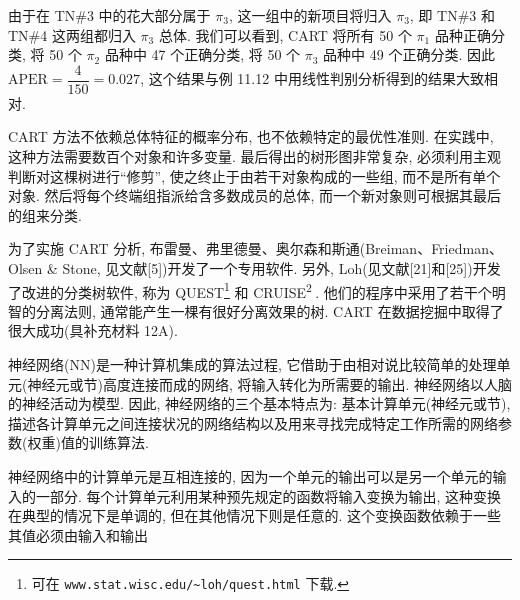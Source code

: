 由于在 TN\#3 中的花大部分属于 $\pi_3$, 这一组中的新项目将归入 $\pi_3$, 即 TN\#3 和 TN\#4 这两组都归入 $\pi_3$ 总体. 我们可以看到, CART 将所有 50 个 $\pi_1$ 品种正确分类, 将 50 个 $\pi_2$ 品种中 47 个正确分类, 将 50 个 $\pi_3$ 品种中 49 个正确分类. 因此 $\mathrm{APER}=\dfrac{4}{150}=0.027$, 这个结果与例 11.12 中用线性判别分析得到的结果大致相对.

CART 方法不依赖总体特征的概率分布, 也不依赖特定的最优性准则. 在实践中, 这种方法需要数百个对象和许多变量. 最后得出的树形图非常复杂, 必须利用主观判断对这棵树进行“修剪”, 使之终止于由若干对象构成的一些组, 而不是所有单个对象. 然后将每个终端组指派给含多数成员的总体, 而一个新对象则可根据其最后的组来分类.

为了实施 CART 分析, 布雷曼、弗里德曼、奥尔森和斯通(Breiman、Friedman、Olsen \& Stone, 见文献[5])开发了一个专用软件. 另外, Loh(见文献[21]和[25])开发了改进的分类树软件, 称为 QUEST\footnote{{\footnotesize 可在 \texttt{www.stat.wisc.edu/\textasciitilde loh/quest.html} 下载.}

} 和 CRUISE\textsuperscript{\textcircled{2}}. 他们的程序中采用了若干个明智的分离法则, 通常能产生一棵有很好分离效果的树. CART 在数据挖掘中取得了很大成功(具补充材料 12A).


神经网络(NN)是一种计算机集成的算法过程, 它借助于由相对说比较简单的处理单元(神经元或节)高度连接而成的网络, 将输入转化为所需要的输出. 神经网络以人脑的神经活动为模型. 因此, 神经网络的三个基本特点为: 基本计算单元(神经元或节), 描述各计算单元之间连接状况的网络结构以及用来寻找完成特定工作所需的网络参数(权重)值的训练算法.

神经网络中的计算单元是互相连接的, 因为一个单元的输出可以是另一个单元的输入的一部分. 每个计算单元利用某种预先规定的函数将输入变换为输出, 这种变换在典型的情况下是单调的, 但在其他情况下则是任意的. 这个变换函数依赖于一些其值必须由输入和输出
